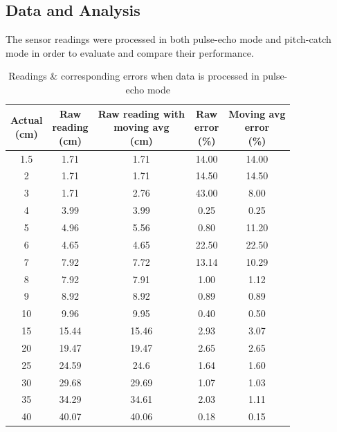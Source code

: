 \documentclass[10pt, conference, compsocconf]{IEEEtran}
\begin{document}
\subsection{Data and Analysis}
The sensor readings were processed in both pulse-echo mode and
pitch-catch mode in order to evaluate and compare their performance.

\begin{table}[!t]
\centering
\caption{Readings \& corresponding errors when data is processed in pulse-echo mode}
\scriptsize
\setlength{\tabcolsep}{3pt}
\begin{tabular}{|c|c|c|c|c|}
\hline
\shortstack{\textbf{Actual}\\\textbf{(cm)}} & \shortstack{\textbf{Raw}\\\textbf{reading}\\\textbf{(cm)}} & \shortstack{\textbf{Raw reading with}\\\textbf{moving avg}\\\textbf{(cm)}} & \shortstack{\textbf{Raw}\\\textbf{error}\\\textbf{(\%)}} & \shortstack{\textbf{Moving avg}\\\textbf{error}\\\textbf{(\%)}} \\ \hline
1.5 & 1.71 & 1.71 & 14.00 & 14.00 \\ \hline
2 & 1.71 & 1.71 & 14.50 & 14.50 \\ \hline
3 & 1.71 & 2.76 & 43.00 & 8.00 \\ \hline
4 & 3.99 & 3.99 & 0.25 & 0.25 \\ \hline
5 & 4.96 & 5.56 & 0.80 & 11.20 \\ \hline
6 & 4.65 & 4.65 & 22.50 & 22.50 \\ \hline
7 & 7.92 & 7.72 & 13.14 & 10.29 \\ \hline
8 & 7.92 & 7.91 & 1.00 & 1.12 \\ \hline
9 & 8.92 & 8.92 & 0.89 & 0.89 \\ \hline
10 & 9.96 & 9.95 & 0.40 & 0.50 \\ \hline
15 & 15.44 & 15.46 & 2.93 & 3.07 \\ \hline
20 & 19.47 & 19.47 & 2.65 & 2.65 \\ \hline
25 & 24.59 & 24.6 & 1.64 & 1.60 \\ \hline
30 & 29.68 & 29.69 & 1.07 & 1.03 \\ \hline
35 & 34.29 & 34.61 & 2.03 & 1.11 \\ \hline
40 & 40.07 & 40.06 & 0.18 & 0.15 \\ \hline

\end{tabular}
\end{table}
\end{document}
